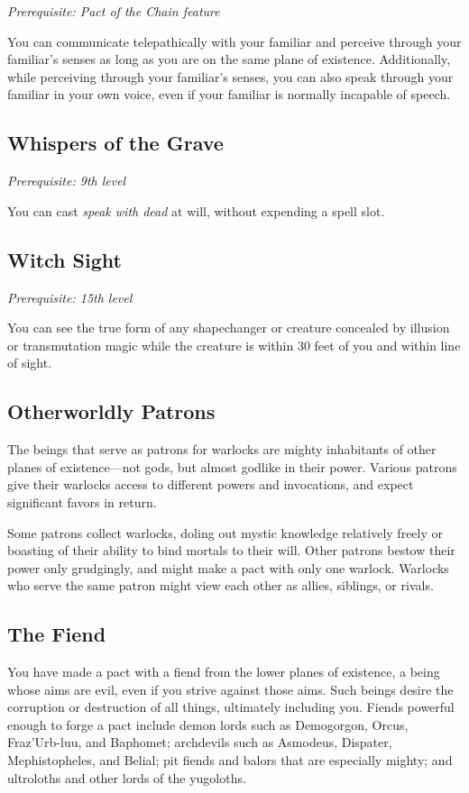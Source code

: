 \textit{Prerequisite: Pact of the Chain feature}

You can communicate telepathically with your familiar and perceive through your familiar's senses as long as you are on the same plane of existence. Additionally, while perceiving through your familiar's senses, you can also speak through your familiar in your own voice, even if your familiar is normally incapable of speech.

\subsection{Whispers of the Grave}

\textit{Prerequisite: 9th level}

You can cast \textit{speak with dead} at will, without expending a spell slot.

\subsection{Witch Sight}

\textit{Prerequisite: 15th level}

You can see the true form of any shapechanger or creature concealed by illusion or transmutation magic while the creature is within 30 feet of you and within line of sight.

\subsection{Otherworldly Patrons}

The beings that serve as patrons for warlocks are mighty inhabitants of other planes of existence—not gods, but almost godlike in their power. Various patrons give their warlocks access to different powers and invocations, and expect significant favors in return.

Some patrons collect warlocks, doling out mystic knowledge relatively freely or boasting of their ability to bind mortals to their will. Other patrons bestow their power only grudgingly, and might make a pact with only one warlock. Warlocks who serve the same patron might view each other as allies, siblings, or rivals.

\subsection{The Fiend}

You have made a pact with a fiend from the lower planes of existence, a being whose aims are evil, even if you strive against those aims. Such beings desire the corruption or destruction of all things, ultimately including you. Fiends powerful enough to forge a pact include demon lords such as Demogorgon, Orcus, Fraz'Urb-luu, and Baphomet; archdevils such as Asmodeus, Dispater, Mephistopheles, and Belial; pit fiends and balors that are especially mighty; and ultroloths and other lords of the yugoloths.

